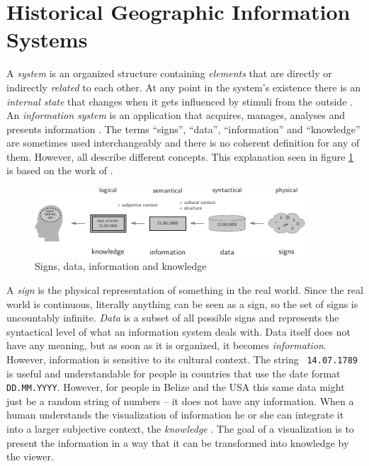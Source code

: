 

\section{Historical Geographic Information Systems} %
\label{sec:historical_geographic_information_systems}

A \emph{system} is an organized structure containing \emph{elements} that are directly or indirectly \emph{related} to each other. At any point in the system's existence there is an \emph{internal state} that changes when it gets influenced by stimuli from the outside \cite{buizdict}. An \emph{information system} is an application that acquires, manages, analyses and presents information \cite{informationSystem}. The terms ``signs'', ``data'', ``information'' and ``knowledge'' are sometimes used interchangeably and there is no coherent definition for any of them. However, all describe different concepts. This explanation seen in figure \ref{fig:information} is based on the work of \cite{datinfwis}.

\begin{figure}[ht]
  \vspace{1em}
  \begin{center}
    \includegraphics[width=0.9\textwidth]{graphics/basics/hgis/information}
  \end{center}
  \caption{Signs, data, information and knowledge}
  \label{fig:information}
\end{figure}

A \emph{sign} is the physical representation of something in the real world. Since the real world is continuous, literally anything can be seen as a sign, so the set of signs is uncountably infinite.
\emph{Data} is a subset of all possible signs and represents the syntactical level of what an information system deals with. Data itself does not have any meaning, but as soon as it is organized, it becomes \emph{information}.
However, information is sensitive to its cultural context. The string ~\texttt{14.07.1789}~ is useful and understandable for people in countries that use the date format \texttt{DD.MM.YYYY}. However, for people in Belize and the USA this same data might just be a random string of numbers -- it does not have any information.
When a human understands the visualization of information he or she can integrate it into a larger subjective context, the \emph{knowledge} \cite{nake}.
The goal of a visualization is to present the information in a way that it can be transformed into knowledge by the viewer.

